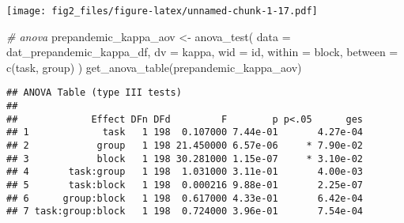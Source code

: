 \documentclass[
]{article}
\newenvironment{Shaded}{\begin{snugshade}}{\end{snugshade}}
\newcommand{\AttributeTok}[1]{\textcolor[rgb]{0.77,0.63,0.00}{#1}}
\newcommand{\CommentTok}[1]{\textcolor[rgb]{0.56,0.35,0.01}{\textit{#1}}}
\newcommand{\FunctionTok}[1]{\textcolor[rgb]{0.00,0.00,0.00}{#1}}
\newcommand{\NormalTok}[1]{#1}
\newcommand{\OtherTok}[1]{\textcolor[rgb]{0.56,0.35,0.01}{#1}}
\begin{document}
\texttt{[image: fig2\_files/figure-latex/unnamed-chunk-1-17.pdf]}

\begin{Shaded}
\begin{Highlighting}[]
\CommentTok{\# anova}
\NormalTok{prepandemic\_kappa\_aov }\OtherTok{\textless{}{-}} \FunctionTok{anova\_test}\NormalTok{(}
  \AttributeTok{data =}\NormalTok{ dat\_prepandemic\_kappa\_df, }\AttributeTok{dv =}\NormalTok{ kappa, }\AttributeTok{wid =}\NormalTok{ id,}
  \AttributeTok{within =}\NormalTok{ block, }\AttributeTok{between =} \FunctionTok{c}\NormalTok{(task, group)}
\NormalTok{)}
\FunctionTok{get\_anova\_table}\NormalTok{(prepandemic\_kappa\_aov)}
\end{Highlighting}
\end{Shaded}

\begin{verbatim}
## ANOVA Table (type III tests)
## 
##             Effect DFn DFd         F        p p<.05      ges
## 1             task   1 198  0.107000 7.44e-01       4.27e-04
## 2            group   1 198 21.450000 6.57e-06     * 7.90e-02
## 3            block   1 198 30.281000 1.15e-07     * 3.10e-02
## 4       task:group   1 198  1.031000 3.11e-01       4.00e-03
## 5       task:block   1 198  0.000216 9.88e-01       2.25e-07
## 6      group:block   1 198  0.617000 4.33e-01       6.42e-04
## 7 task:group:block   1 198  0.724000 3.96e-01       7.54e-04
\end{verbatim}
\end{document}
